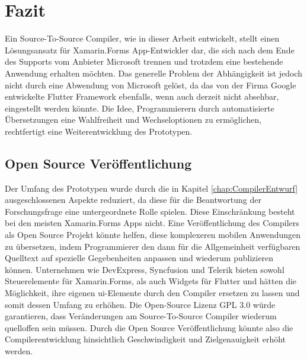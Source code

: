 \chapter{Fazit}
\label{chap:FazitAusblick}
Ein Source-To-Source Compiler,  wie in dieser Arbeit entwickelt, stellt einen Lösungsansatz für Xamarin.Forms App-Entwickler dar,  die sich nach dem Ende des Supports vom Anbieter Microsoft trennen und trotzdem eine bestehende Anwendung erhalten möchten.  Das generelle Problem der Abhängigkeit ist jedoch nicht durch eine Abwendung von Microsoft gelöst, da das von der Firma Google entwickelte Flutter Framework ebenfalls, wenn auch derzeit nicht absehbar,  eingestellt werden könnte.  Die Idee,  Programmierern durch automatisierte Übersetzungen eine Wahlfreiheit und Wechseloptionen zu ermöglichen, rechtfertigt eine Weiterentwicklung des Prototypen.

\section{Open Source Veröffentlichung}

Der Umfang des Prototypen wurde durch die in Kapitel \ref{chap:CompilerEntwurf} ausgeschlossenen Aspekte reduziert,  da diese für die Beantwortung der Forschungsfrage eine untergeordnete Rolle spielen.  Diese Einschränkung besteht bei den meisten Xamarin.Forms Apps nicht.  
Eine Veröffentlichung des Compilers als Open Source Projekt könnte helfen, diese komplexeren 
mobilen Anwendungen zu übersetzen,  indem Programmierer den dann für die Allgemeinheit verfügbaren Quelltext auf spezielle Gegebenheiten anpassen und wiederum publizieren können.  Unternehmen wie DevExpress,  Syncfusion und Telerik bieten sowohl Steuerelemente für 
Xamarin.Forms,  als auch Widgets für Flutter und hätten die Möglichkeit,  ihre eigenen \ac{ui}-Elemente 
durch den Compiler ersetzen zu lassen und somit dessen Umfang zu erhöhen.  Die Open-Source Lizenz GPL 3.0 würde garantieren,  dass Veränderungen am Source-To-Source Compiler wiederum quelloffen sein müssen.  Durch die Open Source Veröffentlichung könnte also die Compilerentwicklung hinsichtlich Geschwindigkeit und Zielgenauigkeit erhöht werden.

